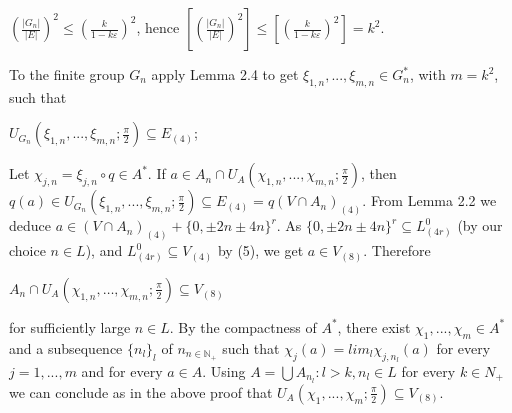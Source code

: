 \documentclass[12pt]{article}
\begin{document}
        $(\frac{|G_n|}{|E|})^2 \leqslant (\frac{k}{1-k \varepsilon})^2$, hence $[(\frac{|G_n|}{|E|})^2]\leqslant[(\frac{k}{1-k \varepsilon})^2]=k^2$.
    

    To the finite group $G_n$ apply Lemma 2.4 to get $\xi_{1,n},...,\xi_{m,n} \in G^*_n$, with $m = k^2$, such that


        $U_{G_n}(\xi_{1,n}, . . . , \xi_{m,n}; \frac{\pi}{2}) \subseteq E_{(4)}$;


    Let $\chi_{j,n} = \xi_{j,n} \circ q \in A^*$. If $a \in A_n \cap U_A(\chi_{1,n},...,\chi_{m,n}; \frac{\pi}{2} )$, then $q(a) \in U_{G_n} (\xi_{1,n},...,\xi_{m,n}; \frac{\pi}{2} ) \subseteq E_{(4)} = q(V \cap A_n)_{(4)}$. From
    Lemma 2.2 we deduce $a \in (V \cap A_n)_{(4)} + \{0,\pm 2n \pm 4n\}^r$. As $\{0,\pm 2n \pm 4n\}^r \subseteq L^0_{(4r)}$ (by our choice $n \in L$), and $L^0_{(4r)} \subseteq V_{(4)}$
    by (5), we get $a \in V_{(8)}$. Therefore


        $A_n \cap U_A (\chi_{1,n},\ldots ,\chi_{m,n}; \frac{\pi}{2}) \subseteq V_{(8)}$

    
    for sufficiently large $n \in L$. By the compactness of $A^*$, there exist $\chi_1,...,\chi_m \in A^*$ and a subsequence $\{n_l\}_l$ of ${n}_{n \in \mathbb{N}_+}$ such
    that $\chi_j (a) = lim_l \chi_{j,n_l}(a)$ for every $j = 1,...,m$ and for every $a \in A$. Using $A = \bigcup{A_{n_l}: l > k, n_l ∈ L}$ for every $k \in {N}_+$ we
    can conclude as in the above proof that $U_A (\chi_1,...,\chi_m; \frac{\pi}{2}) \subseteq V_{(8)}$.
\end{document}
